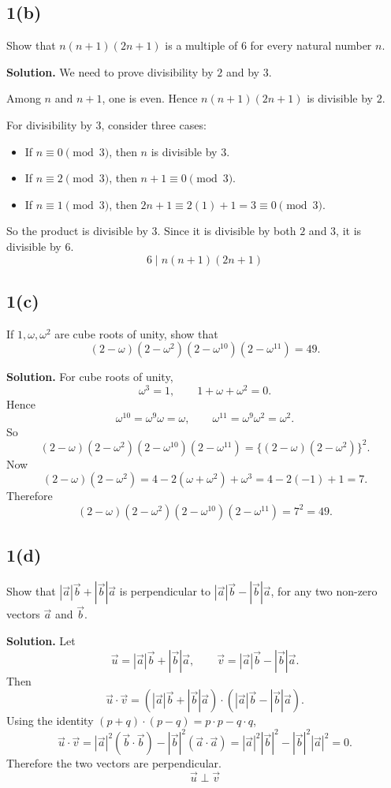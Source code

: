 \documentclass[11pt,a4paper]{article}
\newcommand{\ans}{\textbf{Solution.} }
\newcommand{\final}[1]{\[\boxed{#1}\]}
\begin{document}
\subsection*{1(b)}
\begin{questionbox}
Show that $n(n+1)(2n+1)$ is a multiple of $6$ for every natural number $n$.
\end{questionbox}
\ans
We need to prove divisibility by $2$ and by $3$.

Among $n$ and $n+1$, one is even. Hence $n(n+1)(2n+1)$ is divisible by $2$.

For divisibility by $3$, consider three cases:
\begin{itemize}[leftmargin=*]
\item If $n\equiv 0\pmod 3$, then $n$ is divisible by $3$.
\item If $n\equiv 2\pmod 3$, then $n+1\equiv 0\pmod 3$.
\item If $n\equiv 1\pmod 3$, then $2n+1\equiv 2(1)+1=3\equiv 0\pmod 3$.
\end{itemize}
So the product is divisible by $3$. Since it is divisible by both $2$ and $3$, it is divisible by $6$.
\final{6\mid n(n+1)(2n+1)}

\subsection*{1(c)}
\begin{questionbox}
If $1,\omega,\omega^2$ are cube roots of unity, show that
\[
(2-\omega)(2-\omega^2)(2-\omega^{10})(2-\omega^{11})=49.
\]
\end{questionbox}
\ans
For cube roots of unity,
\[
\omega^3=1,\qquad 1+\omega+\omega^2=0.
\]
Hence
\[
\omega^{10}=\omega^{9}\omega=\omega,
\qquad
\omega^{11}=\omega^9\omega^2=\omega^2.
\]
So
\[
(2-\omega)(2-\omega^2)(2-\omega^{10})(2-\omega^{11})
=\{(2-\omega)(2-\omega^2)\}^2.
\]
Now
\[
(2-\omega)(2-\omega^2)=4-2(\omega+\omega^2)+\omega^3
=4-2(-1)+1=7.
\]
Therefore
\final{(2-\omega)(2-\omega^2)(2-\omega^{10})(2-\omega^{11})=7^2=49.}

\subsection*{1(d)}
\begin{questionbox}
Show that $|\vec a|\vec b+|\vec b|\vec a$ is perpendicular to $|\vec a|\vec b-|\vec b|\vec a$, for any two non-zero vectors $\vec a$ and $\vec b$.
\end{questionbox}
\ans
Let
\[
\vec u=|\vec a|\vec b+|\vec b|\vec a,
\qquad
\vec v=|\vec a|\vec b-|\vec b|\vec a.
\]
Then
\[
\vec u\cdot\vec v
=(|\vec a|\vec b+|\vec b|\vec a)\cdot(|\vec a|\vec b-|\vec b|\vec a).
\]
Using the identity $(p+q)\cdot(p-q)=p\cdot p-q\cdot q$,
\[
\vec u\cdot\vec v
=|\vec a|^2(\vec b\cdot\vec b)-|\vec b|^2(\vec a\cdot\vec a)
=|\vec a|^2|\vec b|^2-|\vec b|^2|\vec a|^2=0.
\]
Therefore the two vectors are perpendicular.
\final{\vec u\perp\vec v}
\end{document}
